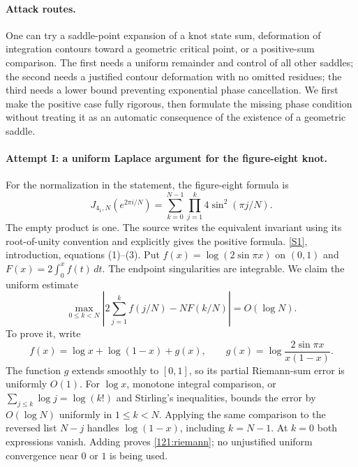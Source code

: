 \documentclass[11pt,a4paper]{article}
\newcommand{\sref}[2]{\hyperlink{source:#1:#2}{[S#2]}}
\numberwithin{equation}{section}
\begin{document}
\paragraph{Attack routes.}
One can try a saddle-point expansion of a knot state sum, deformation
of integration contours toward a geometric critical point, or a
positive-sum comparison.  The first needs a uniform remainder and control
of all other saddles; the second needs a justified contour deformation
with no omitted residues; the third needs a lower bound preventing
exponential phase cancellation.  We first make the positive case fully
rigorous, then formulate the missing phase condition without treating it
as an automatic consequence of the existence of a geometric saddle.

\paragraph{Attempt I: a uniform Laplace argument for the figure-eight knot.}
For the normalization in the statement, the figure-eight formula is
\begin{equation}\label{121:sum}
 J_{4_1,N}(e^{2\pi i/N})=
 \sum_{k=0}^{N-1}\prod_{j=1}^{k}4\sin^2(\pi j/N).
\end{equation}
The empty product is one.  The source writes the equivalent invariant
using its root-of-unity convention and explicitly gives the positive
formula. \sref{121}{1}, introduction, equations (1)--(3).
Put $f(x)=\log(2\sin\pi x)$ on $(0,1)$ and
$F(x)=2\int_0^x f(t)\,dt$.  The endpoint singularities are integrable.
We claim the uniform estimate
\begin{equation}\label{121:riemann}
 \max_{0\leq k<N}\left|
 2\sum_{j=1}^k f(j/N)-NF(k/N)\right|=O(\log N).
\end{equation}
To prove it, write
\[
 f(x)=\log x+\log(1-x)+g(x),\qquad
 g(x)=\log\frac{2\sin\pi x}{x(1-x)}.
\]
The function $g$ extends smoothly to $[0,1]$, so its partial Riemann-sum
error is uniformly $O(1)$.  For $\log x$, monotone integral comparison,
or $\sum_{j\leq k}\log j=\log(k!)$ and Stirling's inequalities, bounds
the error by $O(\log N)$ uniformly in $1\leq k<N$.  Applying the same
comparison to the reversed list $N-j$ handles $\log(1-x)$, including
$k=N-1$.  At $k=0$ both expressions vanish.  Adding proves
\eqref{121:riemann}; no unjustified uniform convergence near $0$ or $1$
is being used.
\end{document}
